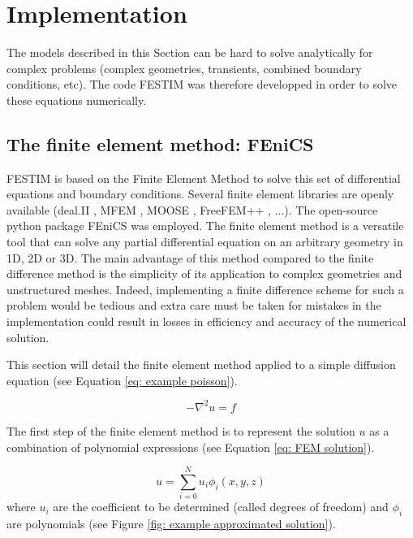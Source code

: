 \section{Implementation}


The models described in this Section can be hard to solve analytically for complex problems (complex geometries, transients, combined boundary conditions, etc).
The code FESTIM  was therefore developped in order to solve these equations numerically.

\subsection{The finite element method: FEniCS}
FESTIM is based on the Finite Element Method to solve this set of differential equations and boundary conditions.
Several finite element libraries are openly available (deal.II , MFEM , MOOSE , FreeFEM++ , ...).
The open-source python package FEniCS  was employed.
The finite element method is a versatile tool that can solve any partial differential equation on an arbitrary geometry in 1D, 2D or 3D.
The main advantage of this method compared to the finite difference method is the simplicity of its application to complex geometries and unstructured meshes.
Indeed, implementing a finite difference scheme for such a problem would be tedious and extra care must be taken for mistakes in the implementation could result in losses in efficiency and accuracy of the numerical solution.

This section will detail the finite element method applied to a simple diffusion equation (see Equation \ref{eq: example poisson}).

\begin{equation}
    -\nabla^2 u = f
    \label{eq: example poisson}
\end{equation}

The first step of the finite element method is to represent the solution $u$ as a combination of polynomial expressions (see Equation \ref{eq: FEM solution}).

\begin{equation}
    u = \sum^N_{i=0}u_i \phi_i(x, y, z)
    \label{eq: FEM solution}
\end{equation}
where $u_i$ are the coefficient to be determined (called degrees of freedom) and $\phi_i$ are polynomials (see Figure \ref{fig: example approximated solution}).

